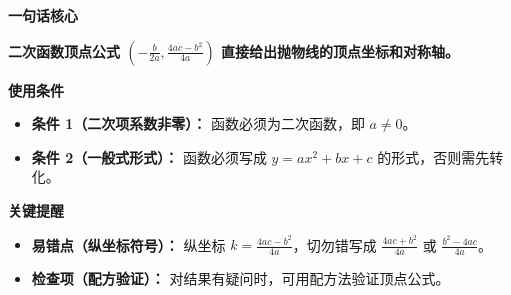 \begin{summarybox}
	\textbf{\textcolor{CSummary}{一句话核心}}

	\textbf{二次函数顶点公式 $(-\frac{b}{2a},\frac{4ac-b^2}{4a})$ 直接给出抛物线的顶点坐标和对称轴。}

	\medskip
	\textbf{\textcolor{CSummary}{使用条件}}
	\begin{itemize}[leftmargin=*, itemsep=0.5em, topsep=0.4em]
		\item \textbf{条件 1（二次项系数非零）：} 函数必须为二次函数，即 $a\neq 0$。
		\item \textbf{条件 2（一般式形式）：} 函数必须写成 $y=ax^2+bx+c$ 的形式，否则需先转化。
	\end{itemize}

	\medskip
	\textbf{\textcolor{CSummary}{关键提醒}}
	\begin{itemize}[leftmargin=*, itemsep=0.5em, topsep=0.4em]
		\item \textbf{易错点（纵坐标符号）：} 纵坐标 $k=\frac{4ac-b^2}{4a}$，切勿错写成 $\frac{4ac+b^2}{4a}$ 或 $\frac{b^2-4ac}{4a}$。
		\item \textbf{检查项（配方验证）：} 对结果有疑问时，可用配方法验证顶点公式。
	\end{itemize}
\end{summarybox}
